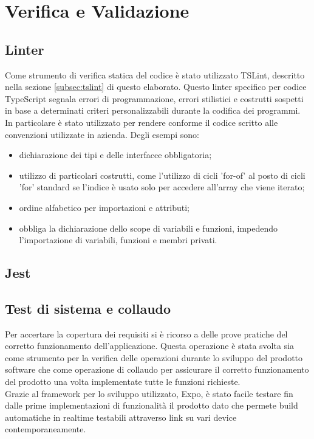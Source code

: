 
\chapter{Verifica e Validazione}\label{chap:tests}
\section{Linter}
Come strumento di verifica statica del codice è stato utilizzato TSLint, descritto nella sezione \ref{subsec:tslint} di questo elaborato. Questo linter specifico per codice TypeScript segnala errori di programmazione, errori stilistici e costrutti sospetti in base a determinati criteri personalizzabili durante la codifica dei programmi.\\
In particolare è stato utilizzato per rendere conforme il codice scritto alle convenzioni utilizzate in azienda. Degli esempi sono:
\begin{itemize}
	\item dichiarazione dei tipi e delle interfacce obbligatoria;
	\item utilizzo di particolari costrutti, come l'utilizzo di cicli 'for-of' al posto di cicli 'for' standard se l'indice è usato solo per accedere all'array che viene iterato;
	\item ordine alfabetico per importazioni e attributi; 
	\item obbliga la dichiarazione dello scope di variabili e funzioni, impedendo l'importazione di variabili, funzioni e membri privati.
\end{itemize}
\section{Jest}
\section{Test di sistema e collaudo}
Per accertare la copertura dei requisiti si è ricorso a delle prove pratiche del corretto funzionamento dell’applicazione. Questa operazione è stata svolta sia come strumento per la verifica delle operazioni durante lo sviluppo del prodotto software che come operazione di collaudo per assicurare il corretto funzionamento del prodotto una volta implementate tutte le funzioni richieste. \\
Grazie al framework per lo sviluppo utilizzato, Expo, è stato facile testare fin dalle prime implementazioni di funzionalità il prodotto dato che permete build automatiche in realtime testabili attraverso link su vari device contemporaneamente.
